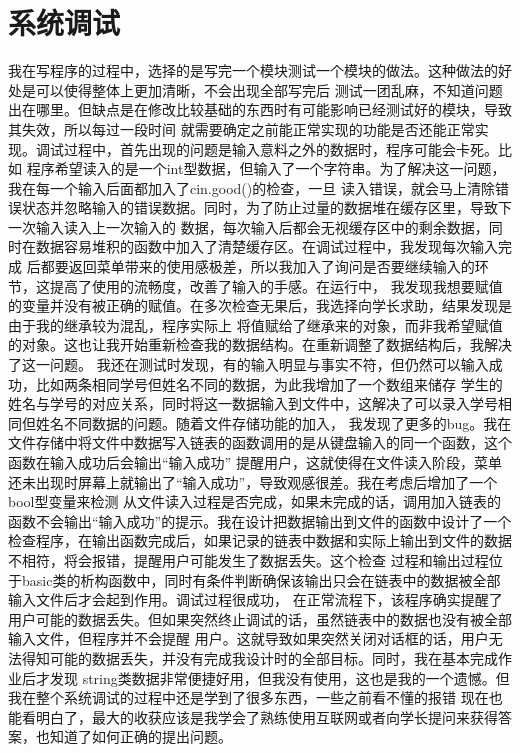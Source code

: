 \documentclass[fontset=windows]{article}
\begin{document}
\section{系统调试}
我在写程序的过程中，选择的是写完一个模块测试一个模块的做法。这种做法的好处是可以使得整体上更加清晰，不会出现全部写完后
测试一团乱麻，不知道问题出在哪里。但缺点是在修改比较基础的东西时有可能影响已经测试好的模块，导致其失效，所以每过一段时间
就需要确定之前能正常实现的功能是否还能正常实现。调试过程中，首先出现的问题是输入意料之外的数据时，程序可能会卡死。比如
程序希望读入的是一个int型数据，但输入了一个字符串。为了解决这一问题，我在每一个输入后面都加入了cin.good()的检查，一旦
读入错误，就会马上清除错误状态并忽略输入的错误数据。同时，为了防止过量的数据堆在缓存区里，导致下一次输入读入上一次输入的
数据，每次输入后都会无视缓存区中的剩余数据，同时在数据容易堆积的函数中加入了清楚缓存区。在调试过程中，我发现每次输入完成
后都要返回菜单带来的使用感极差，所以我加入了询问是否要继续输入的环节，这提高了使用的流畅度，改善了输入的手感。在运行中，
我发现我想要赋值的变量并没有被正确的赋值。在多次检查无果后，我选择向学长求助，结果发现是由于我的继承较为混乱，程序实际上
将值赋给了继承来的对象，而非我希望赋值的对象。这也让我开始重新检查我的数据结构。在重新调整了数据结构后，我解决了这一问题。
我还在测试时发现，有的输入明显与事实不符，但仍然可以输入成功，比如两条相同学号但姓名不同的数据，为此我增加了一个数组来储存
学生的姓名与学号的对应关系，同时将这一数据输入到文件中，这解决了可以录入学号相同但姓名不同数据的问题。随着文件存储功能的加入，
我发现了更多的bug。我在文件存储中将文件中数据写入链表的函数调用的是从键盘输入的同一个函数，这个函数在输入成功后会输出“输入成功”
提醒用户，这就使得在文件读入阶段，菜单还未出现时屏幕上就输出了“输入成功”，导致观感很差。我在考虑后增加了一个bool型变量来检测
从文件读入过程是否完成，如果未完成的话，调用加入链表的函数不会输出“输入成功”的提示。我在设计把数据输出到文件的函数中设计了一个
检查程序，在输出函数完成后，如果记录的链表中数据和实际上输出到文件的数据不相符，将会报错，提醒用户可能发生了数据丢失。这个检查
过程和输出过程位于basic类的析构函数中，同时有条件判断确保该输出只会在链表中的数据被全部输入文件后才会起到作用。调试过程很成功，
在正常流程下，该程序确实提醒了用户可能的数据丢失。但如果突然终止调试的话，虽然链表中的数据也没有被全部输入文件，但程序并不会提醒
用户。这就导致如果突然关闭对话框的话，用户无法得知可能的数据丢失，并没有完成我设计时的全部目标。同时，我在基本完成作业后才发现
string类数据非常便捷好用，但我没有使用，这也是我的一个遗憾。但我在整个系统调试的过程中还是学到了很多东西，一些之前看不懂的报错
现在也能看明白了，最大的收获应该是我学会了熟练使用互联网或者向学长提问来获得答案，也知道了如何正确的提出问题。
\end{document}
